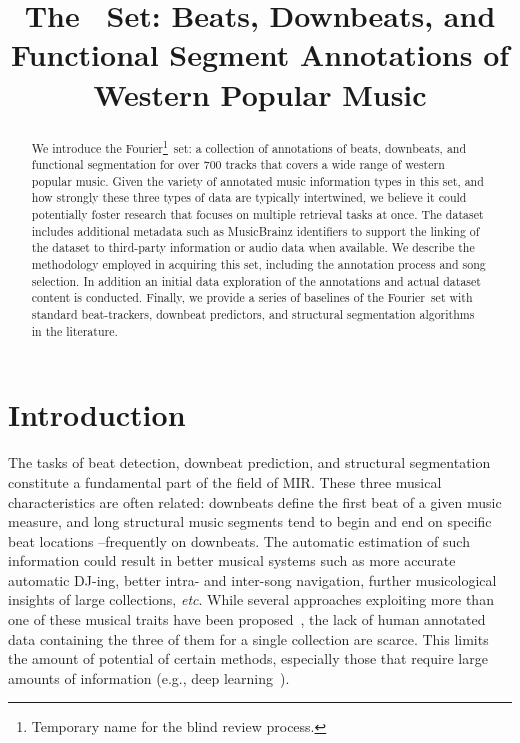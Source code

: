 \documentclass{article}
\title{The \setName~Set: Beats, Downbeats, and Functional Segment Annotations of Western Popular Music}
\newcommand{\setName}{Fourier}
\begin{document}
%
\maketitle
%
\begin{abstract}
    We introduce the \setName\footnote{Temporary name for the blind review process.}~set: a collection of annotations of beats, downbeats, and functional segmentation for over 700 tracks that covers a wide range of western popular music.
    Given the variety of annotated music information types in this set, and how strongly these three types of data are typically intertwined, we believe it could potentially foster research that focuses on multiple retrieval tasks at once.
    The dataset includes additional metadata such as MusicBrainz identifiers to support the linking of the dataset to third-party information or audio data when available.
    We describe the methodology employed in acquiring this set, including the annotation process and song selection. In addition an initial data exploration of the annotations and actual dataset content is conducted. 
    Finally, we provide a series of baselines of the \setName~set with standard beat-trackers, downbeat predictors, and structural segmentation algorithms in the literature.
\end{abstract}
%
\section{Introduction}\label{sec:introduction}

The tasks of beat detection, downbeat prediction, and structural segmentation constitute a fundamental part of the field of MIR.
These three musical characteristics are often related: downbeats define the first beat of a given music measure, and long structural music segments tend to begin and end on specific beat locations --frequently on downbeats.
The automatic estimation of such information could result in better musical systems such as more accurate automatic DJ-ing, better intra- and inter-song navigation, further musicological insights of large collections, \emph{etc}.
While several approaches exploiting more than one of these musical traits have been proposed~\cite{Bock2016, Fuentes2019}, the lack of human annotated data containing the three of them for a single collection are scarce.
This limits the amount of potential of certain methods, especially those that require large amounts of information (e.g., deep learning~\cite{Humphrey2012}).
\end{document}
